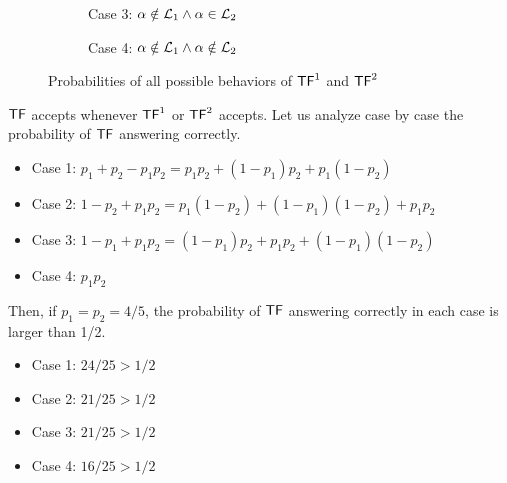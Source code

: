 \begin{figure}[htbp]
  \begin{subfigure}[t]{0.48\linewidth}
    \centering
    \captionsetup{labelformat=empty}
    \caption{Case 3: $\alpha \notin \mathcal{L}_1 \land \alpha \in \mathcal{L}_2$}
  \end{subfigure}
  \hfill
  \begin{subfigure}[t]{0.48\linewidth}
    \centering
    \captionsetup{labelformat=empty}
    \caption{Case 4: $\alpha \notin \mathcal{L}_1 \land \alpha \notin \mathcal{L}_2$}
  \end{subfigure}

  \caption{Probabilities of all possible behaviors of $\mathsf{TF}^1$ and $\mathsf{TF}^2$}
  \label{fig:cases}
\end{figure}

$\mathsf{TF}$ accepts whenever $\mathsf{TF}^1$ or $\mathsf{TF}^2$ accepts.
Let us analyze case by case the probability of $\mathsf{TF}$ answering correctly.
%
\begin{itemize}
    \item Case 1: $p_1 + p_2 - p_1p_2 = p_1p_2 + (1-p_1)p_2 + p_1(1-p_2)$
    \item Case 2: $1 - p_2 + p_1p_2  = p_1(1-p_2) + (1-p_1)(1-p_2) + p_1p_2$
    \item Case 3: $1 - p_1 + p_1p_2  = (1-p_1)p_2 + p_1p_2 + (1-p_1)(1-p_2)$
    \item Case 4: $p_1p_2$
\end{itemize}
%
Then, if $p_1 = p_2 = 4/5$, the probability of $\mathsf{TF}$ answering correctly in each case is larger than 1/2.
%
\begin{itemize}
    \item Case 1: $24/25 > 1/2$
    \item Case 2: $21/25 > 1/2$
    \item Case 3: $21/25 > 1/2$
    \item Case 4: $16/25 > 1/2$
\end{itemize}

